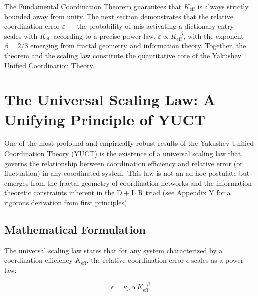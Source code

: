 \documentclass[11pt,a4paper]{article}
\begin{document}
The Fundamental Coordination Theorem guarantees that \(K_{\mathrm{eff}}\) is
always strictly bounded away from unity. The next section demonstrates that
the relative coordination error \(\varepsilon\) — the probability of
mis‑activating a dictionary entry — scales with \(K_{\mathrm{eff}}\) according
to a precise power law, \(\varepsilon \propto K_{\mathrm{eff}}^{-\beta}\), with
the exponent \(\beta = 2/3\) emerging from fractal geometry and information
theory. Together, the theorem and the scaling law constitute the quantitative
core of the Yakushev Unified Coordination Theory.

\section{The Universal Scaling Law: A Unifying Principle of YUCT}

\label{sec:universal_scaling}

One of the most profound and empirically robust results of the Yakushev Unified Coordination Theory (YUCT) is the existence of a universal scaling law that governs the relationship between coordination efficiency and relative error (or fluctuation) in any coordinated system. This law is not an ad-hoc postulate but emerges from the fractal geometry of coordination networks and the information-theoretic constraints inherent in the \(\mathrm{D} + \mathrm{I}\cdot \mathrm{R}\) triad (see Appendix Y for a rigorous derivation from first principles).

\subsection{Mathematical Formulation}

The universal scaling law states that for any system characterized by a coordination efficiency \(K_{\mathrm{eff}}\), the relative coordination error \(\epsilon\) scales as a power law:

\begin{equation}
	\boxed{\epsilon = \kappa_c \, \alpha \, K_{\mathrm{eff}}^{-\beta}}
	\label{eq:universal_scaling}
\end{equation}
\end{document}
